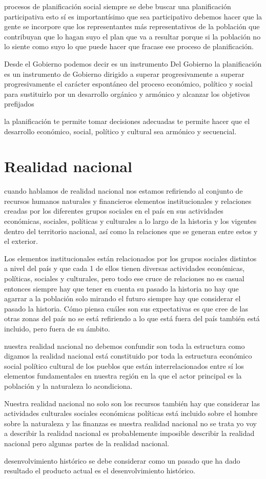 \documentclass[
  a4paper,
]{article}
\begin{document}
procesos de planificación social siempre se debe buscar una
planificación participativa esto sí es importantísimo que sea
participativo debemos hacer que la gente se incorpore que los
representantes más representativos de la población que contribuyan que
lo hagan suyo el plan que va a resultar porque si la población no lo
siente como suyo lo que puede hacer que fracase ese proceso de
planificación.

Desde el Gobierno podemos decir es un instrumento Del Gobierno la
planificación es un instrumento de Gobierno dirigido a superar
progresivamente a superar progresivamente el carácter espontáneo del
proceso económico, político y social para sustituirlo por un desarrollo
orgánico y armónico y alcanzar los objetivos prefijados

la planificación te permite tomar decisiones adecuadas te permite hacer
que el desarrollo económico, social, político y cultural sea armónico y
secuencial.

\section{Realidad nacional}\label{realidad-nacional}

cuando hablamos de realidad nacional nos estamos refiriendo al conjunto
de recursos humanos naturales y financieros elementos institucionales y
relaciones creadas por los diferentes grupos sociales en el país en sus
actividades económicas, sociales, políticas y culturales a lo largo de
la historia y los vigentes dentro del territorio nacional, así como la
relaciones que se generan entre estos y el exterior.

Los elementos institucionales están relacionados por los grupos sociales
distintos a nivel del país y que cada 1 de ellos tienen diversas
actividades económicas, políticas, sociales y culturales, pero todo ese
cruce de relaciones no es casual entonces siempre hay que tener en
cuenta su pasado la historia no hay que agarrar a la población solo
mirando el futuro siempre hay que considerar el pasado la historia. Cómo
piensa cuáles son sus expectativas es que cree de las otras zonas del
país no se está refiriendo a lo que está fuera del país también está
incluido, pero fuera de su ámbito.

nuestra realidad nacional no debemos confundir son toda la estructura
como digamos la realidad nacional está constituido por toda la
estructura económico social político cultural de los pueblos que están
interrelacionados entre sí los elementos fundamentales en nuestra región
en la que el actor principal es la población y la naturaleza lo
acondiciona.

Nuestra realidad nacional no solo son los recursos también hay que
considerar las actividades culturales sociales económicas políticas está
incluido sobre el hombre sobre la naturaleza y las finanzas es nuestra
realidad nacional no se trata yo voy a describir la realidad nacional es
probablemente imposible describir la realidad nacional pero algunas
partes de la realidad nacional.

desenvolvimiento histórico se debe considerar como un pasado que ha dado
resultado el producto actual es el desenvolvimiento histórico.


\printbibliography
\end{document}
